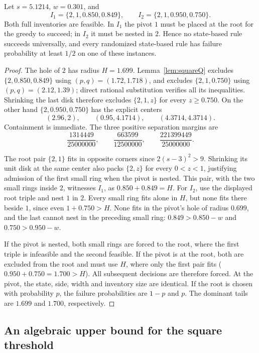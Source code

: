 \begin{theorem}\label{thm:squaretwins}
Let $s=5.1214$, $w=0.301$, and
\[
 I_1=\{2,1,0.850,0.849\},\qquad
 I_2=\{2,1,0.950,0.750\}.
\]
Both full inventories are feasible. In $I_1$ the pivot $1$ must be
placed at the root for the greedy to succeed; in $I_2$ it must be
nested in $2$. Hence no state-based rule succeeds universally, and
every randomized state-based rule has failure probability at least
$1/2$ on one of these instances.
\end{theorem}
\begin{proof}
The hole of $2$ has radius $H=1.699$. Lemma~\ref{lem:squareQ}
excludes $\{2,0.850,0.849\}$ using $(p,q)=(1.72,1.718)$, and
excludes $\{2,1,0.750\}$ using $(p,q)=(2.12,1.39)$; direct rational
substitution verifies all its inequalities. Shrinking the last disk
therefore excludes $\{2,1,z\}$ for every $z\ge0.750$.
On the other hand $\{2,0.950,0.750\}$ has the explicit centers
\[
 (2.96,2),\qquad(0.95,4.1714),\qquad(4.3714,4.3714).
\]
Containment is immediate. The three positive separation margins are
\[
\frac{1314449}{25000000},\qquad\frac{663599}{12500000},\qquad
\frac{221399449}{25000000}.
\]

The root pair $\{2,1\}$ fits in opposite corners since
$2(s-3)^2>9$. Shrinking its unit disk at the same center also
packs $\{2,z\}$ for every $0<z<1$, justifying admission of the
first small ring when the pivot is nested.
This pair, with the two small rings inside $2$,
witnesses $I_1$, as $0.850+0.849=H$.
For $I_2$, use the displayed root triple and nest $1$ in $2$.
Every small ring fits alone in $H$, but none fits there beside $1$,
since even $1+0.750>H$. None fits in the pivot's hole of radius
$0.699$, and the last cannot nest in the preceding small ring:
$0.849>0.850-w$ and $0.750>0.950-w$.

If the pivot is nested, both small rings are forced to the root,
where the first triple is infeasible and the second feasible.
If the pivot is at the root, both are excluded from the root and
must use $H$, where only the first pair fits
($0.950+0.750=1.700>H$). All subsequent decisions are therefore
forced. At the pivot, the state, side, width and inventory size are
identical. If the root is chosen with probability $p$, the failure
probabilities are $1-p$ and $p$. The dominant tails are $1.699$ and
$1.700$, respectively.
\end{proof}

\subsection{An algebraic upper bound for the square threshold}
\label{sec:squarelimit}

